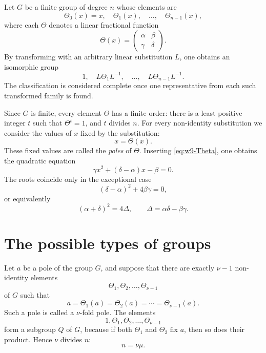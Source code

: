 \documentclass[11pt]{article}
\begin{document}
Let $G$ be a finite group of degree $n$ whose elements are
\begin{equation}\label{eq:w9-G-elements}
 \Theta_0(x)=x,
 \quad \Theta_1(x),\quad\ldots,\quad\Theta_{n-1}(x),
\end{equation}
where each $\Theta$ denotes a linear fractional function
\begin{equation}\label{eq:w9-Theta}
 \Theta(x)=\begin{pmatrix}\alpha&\beta\\ \gamma&\delta\end{pmatrix}.
\end{equation}
By transforming with an arbitrary linear substitution $L$, one obtains an isomorphic group
\[
 1,
 \quad L\Theta_1L^{-1},
 \quad\ldots,
 \quad L\Theta_{n-1}L^{-1}.
\]
The classification is considered complete once one representative from each such transformed family is found.

Since $G$ is finite, every element $\Theta$ has a finite order: there is a least positive integer $t$ such that $\Theta^t=1$, and $t$ divides $n$.  For every non-identity substitution we consider the values of $x$ fixed by the substitution:
\begin{equation}\label{eq:w9-pole-def}
 x=\Theta(x).
\end{equation}
These fixed values are called the \emph{poles} of $\Theta$.  Inserting \eqref{eq:w9-Theta}, one obtains the quadratic equation
\begin{equation}\label{eq:w9-pole-eq}
 \gamma x^2+(\delta-\alpha)x-\beta=0.
\end{equation}
The roots coincide only in the exceptional case
\begin{equation}\label{eq:w9-discriminant}
 (\delta-\alpha)^2+4\beta\gamma=0,
\end{equation}
or equivalently
\begin{equation}\label{eq:w9-tracecondition}
 (\alpha+\delta)^2=4\Delta,
 \qquad \Delta=\alpha\delta-\beta\gamma.
\end{equation}

\section{The possible types of groups}

Let $a$ be a pole of the group $G$, and suppose that there are exactly $\nu-1$ non-identity elements
\[
 \Theta_1,\Theta_2,\ldots,\Theta_{\nu-1}
\]
of $G$ such that
\begin{equation}\label{eq:w9-nu-pole}
 a=\Theta_1(a)=\Theta_2(a)=\cdots=\Theta_{\nu-1}(a).
\end{equation}
Such a pole is called a $\nu$-fold pole.  The elements
\begin{equation}\label{eq:w9-Q}
 1,\Theta_1,\Theta_2,\ldots,\Theta_{\nu-1}
\end{equation}
form a subgroup $Q$ of $G$, because if both $\Theta_1$ and $\Theta_2$ fix $a$, then so does their product.  Hence $\nu$ divides $n$:
\begin{equation}\label{eq:w9-nmunu}
 n=\nu\mu.
\end{equation}
\end{document}
